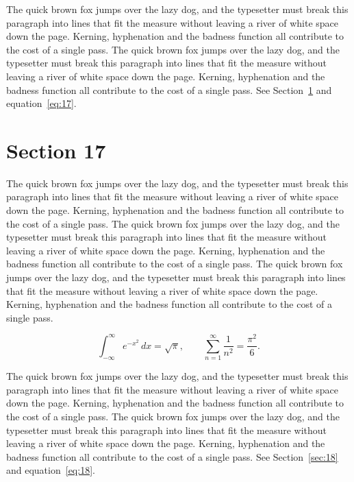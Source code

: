 \documentclass{article}
\begin{document}
The quick brown fox jumps over the lazy dog, and the typesetter must break this paragraph into lines that fit the measure without leaving a river of white space down the page. Kerning, hyphenation and the badness function all contribute to the cost of a single pass. The quick brown fox jumps over the lazy dog, and the typesetter must break this paragraph into lines that fit the measure without leaving a river of white space down the page. Kerning, hyphenation and the badness function all contribute to the cost of a single pass. 
See Section~\ref{sec:17} and equation~\eqref{eq:17}.
\section{Section 17}
\label{sec:17}
The quick brown fox jumps over the lazy dog, and the typesetter must break this paragraph into lines that fit the measure without leaving a river of white space down the page. Kerning, hyphenation and the badness function all contribute to the cost of a single pass. The quick brown fox jumps over the lazy dog, and the typesetter must break this paragraph into lines that fit the measure without leaving a river of white space down the page. Kerning, hyphenation and the badness function all contribute to the cost of a single pass. The quick brown fox jumps over the lazy dog, and the typesetter must break this paragraph into lines that fit the measure without leaving a river of white space down the page. Kerning, hyphenation and the badness function all contribute to the cost of a single pass. 

\begin{equation}\label{eq:17}
\int_{-\infty}^{\infty} e^{-x^{2}}\,dx = \sqrt{\pi}, \qquad
\sum_{n=1}^{\infty} \frac{1}{n^{2}} = \frac{\pi^{2}}{6}.
\end{equation}

The quick brown fox jumps over the lazy dog, and the typesetter must break this paragraph into lines that fit the measure without leaving a river of white space down the page. Kerning, hyphenation and the badness function all contribute to the cost of a single pass. The quick brown fox jumps over the lazy dog, and the typesetter must break this paragraph into lines that fit the measure without leaving a river of white space down the page. Kerning, hyphenation and the badness function all contribute to the cost of a single pass. 
See Section~\ref{sec:18} and equation~\eqref{eq:18}.
\end{document}
